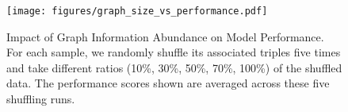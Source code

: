\begin{figure}[t]
\centering
\texttt{[image: figures/graph\_size\_vs\_performance.pdf]}
\vspace{-1.5em}
\caption{Impact of Graph Information Abundance on Model Performance. For each sample, we randomly shuffle its associated triples five times and take different ratios (10\%, 30\%, 50\%, 70\%, 100\%) of the shuffled data. The performance scores shown are averaged across these five shuffling runs.}
\label{fig:graph_ab}
\vspace{-0.5em}
\end{figure}